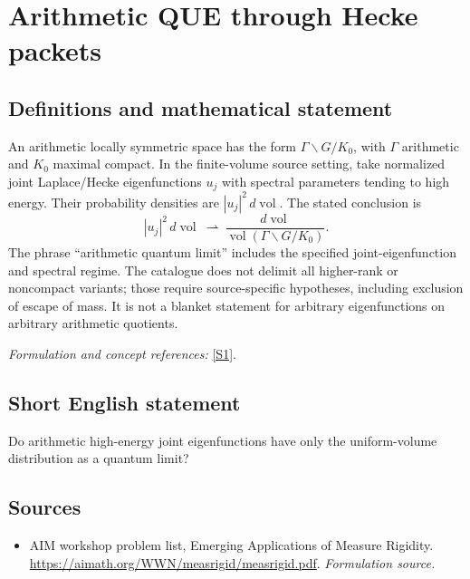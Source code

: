 \documentclass[11pt]{article}
\begin{document}
\section*{\texorpdfstring{Arithmetic QUE through Hecke packets}{Arithmetic QUE through Hecke packets}}\label{statement}
\subsection{Definitions and mathematical statement}
An arithmetic locally symmetric space has the form $\Gamma\backslash G/K_0$, with $\Gamma$ arithmetic and $K_0$ maximal compact. In the finite-volume source setting, take normalized joint Laplace/Hecke eigenfunctions $u_j$ with spectral parameters tending to high energy. Their probability densities are $|u_j|^2\,d\operatorname{vol}$. The stated conclusion is
\[
 |u_j|^2\,d\operatorname{vol}\ \rightharpoonup\
 \frac{d\operatorname{vol}}{\operatorname{vol}(\Gamma\backslash G/K_0)}.
\]
The phrase ``arithmetic quantum limit'' includes the specified joint-eigenfunction and spectral regime. The catalogue does not delimit all higher-rank or noncompact variants; those require source-specific hypotheses, including exclusion of escape of mass. It is not a blanket statement for arbitrary eigenfunctions on arbitrary arithmetic quotients.
\par\smallskip\textit{Formulation and concept references:} \href{https://aimath.org/WWN/measrigid/measrigid.pdf}{[S1]}.

\subsection{Short English statement}
Do arithmetic high-energy joint eigenfunctions have only the uniform-volume distribution as a quantum limit?
\subsection{Sources}
\begin{itemize}
\item[S1]AIM workshop problem list, Emerging Applications of Measure Rigidity.
\url{https://aimath.org/WWN/measrigid/measrigid.pdf}.
\textit{Formulation source.}
\end{itemize}
\end{document}
